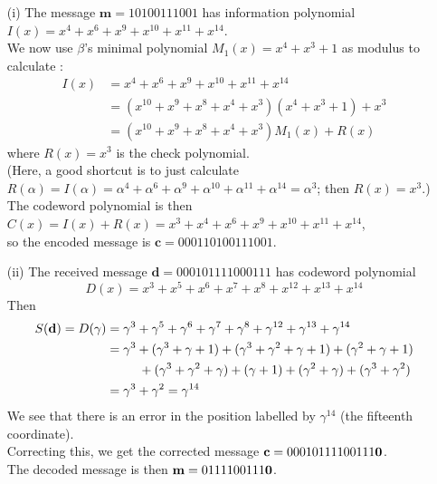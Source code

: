 \documentclass[11pt]{article}
\renewcommand{\vec}[1]{\mathbf{#1}}
\begin{document}
\begin{itemize}
    \begin{itemize}
      \item[(i)]   The message $\vec{m} = \text{10100111001}$ has
                   information polynomial $I(x) = x^4 + x^6 + x^9 + x^{10} + x^{11} + x^{14}$.\\
                   We now use $\beta$'s minimal polynomial $M_1(x) = x^4 + x^3 + 1$ as modulus
                   to calculate :
                   \begin{align*}
                     I(x) &= x^4 + x^6 + x^9 + x^{10} + x^{11} + x^{14}\\
                          &= (x^{10}+x^9+x^8+x^4+x^3)(x^4+x^3+1) + x^3\\
                          &= (x^{10}+x^9+x^8+x^4+x^3)M_1(x) + R(x)
                   \end{align*}
                   where $R(x) = x^3$ is the check polynomial.\\
                   (Here, a good shortcut is to just calculate
                   $R(\alpha) = I(\alpha) = \alpha^4 + \alpha^6 + \alpha^9 + \alpha^{10} + \alpha^{11} + \alpha^{14} = \alpha^3$;
                   then $R(x) = x^3$.)\\
                   The codeword polynomial is then
                   $C(x) = I(x) + R(x) = x^3 + x^4 + x^6 + x^9 + x^{10} + x^{11} + x^{14}$,\\
                   so the encoded message is $\vec{c} = \text{000110100111001}$.
      \item[(ii)]  The received message $\vec{d} = \text{000101111000111}$
                   has codeword polynomial
                   \[
                     D(x) = x^3 + x^5 + x^6 + x^7 + x^8 + x^{12} + x^{13} + x^{14}
                   \]
                   Then
                   \begin{align*}
                     S(\vec{d}) = D(\gamma)
                               &= \gamma^3 + \gamma^5 + \gamma^6 + \gamma^7 + \gamma^8 + \gamma^{12} + \gamma^{13} + \gamma^{14}\\
                               &= \gamma^3 + (\gamma^3 + \gamma + 1) + (\gamma^3 + \gamma^2 + \gamma + 1)
                                 +(\gamma^2 + \gamma + 1)\\
                               &\hspace*{9mm} + (\gamma^3 + \gamma^2 + \gamma)
                                 +(\gamma + 1) + (\gamma^2 + \gamma) + (\gamma^3 + \gamma^2)\\
                               &= \gamma^3 + \gamma^2
                                = \gamma^{14}
                   \end{align*}
                   We see that there is an error in the position labelled by $\gamma^{14}$ (the fifteenth coordinate).\\
                   Correcting this, we get the corrected message
                   $\vec{c} = \text{00010111100111\textbf{0}}$.\\
                   The decoded message is then $\vec{m} = \text{0111100111\textbf{0}}$.
        \end{itemize}
\end{itemize}
\end{document}

